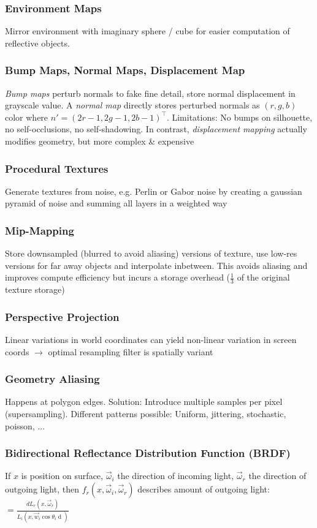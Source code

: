 \documentclass[a4paper,10pt]{article}
\begin{document}
\subsubsection{Environment Maps} Mirror environment with imaginary sphere / cube for easier computation of reflective objects.
\subsubsection{Bump Maps, Normal Maps, Displacement Map} \emph{Bump maps} perturb normals to fake fine detail, store normal displacement in grayscale value. A \emph{normal map} directly stores perturbed normals as \( (r,g,b) \) color where \( n' = (2r - 1, 2g - 1, 2b -1)^\top \). Limitations: No bumps on silhouette, no self-occlusions, no self-shadowing. In contrast, \emph{displacement mapping} actually modifies geometry, but more complex \& expensive
\subsubsection{Procedural Textures} Generate textures from noise, e.g. Perlin or Gabor noise by creating a gaussian pyramid of noise and summing all layers in a weighted way
\subsubsection{Mip-Mapping} Store downsampled (blurred to avoid aliasing) versions of texture, use low-res versions for far away objects and interpolate inbetween. This avoids aliasing and improves compute efficiency but incurs a storage overhead (\( \frac{1}{3} \) of the original texture storage)
\subsubsection{Perspective Projection} Linear variations in world coordinates can yield non-linear variation in screen coords \( \to  \) optimal resampling filter is spatially variant
\subsubsection{Geometry Aliasing} Happens at polygon edges. Solution: Introduce multiple samples per pixel (supersampling). Different patterns possible: Uniform, jittering, stochastic, poisson, ...

\subsubsection{Bidirectional Reflectance Distribution Function (BRDF)}
If \( x \) is position on surface, \( \vec{\omega}_i \) the direction of incoming light, \( \vec{\omega}_r \) the direction of outgoing light, then \( f_r(x, \vec{\omega}_i, \vec{\omega}_r) \) describes amount of outgoing light:
\( = \frac{dL_r(x, \vec{\omega}_r)}{L_i(x, \vec{w}_i \cos \theta _i \mathop{d\vec{w}_i})} \)
\end{document}
